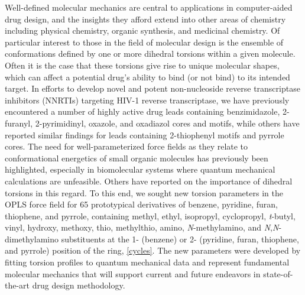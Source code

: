 \documentclass[12pt]{report}
\begin{document}
Well-defined molecular mechanics are central to applications in computer-aided drug design, and the insights they afford extend into other areas of chemistry including physical chemistry, organic synthesis, and medicinal chemistry.\cite{brameld} Of particular interest to those in the field of molecular design is the ensemble of conformations defined by one or more dihedral torsions within a given molecule. Often it is the case that these torsions give rise to unique molecular shapes, which can affect a potential drug's ability to bind (or not bind) to its intended target. In efforts to develop novel and potent non-nucleoside reverse transcriptase inhibitors (NNRTIs) targeting HIV-1 reverse transcriptase, we have previously encountered a number of highly active drug leads containing benzimidazole,\cite{kroeger} 2-furanyl,\cite{jorgbasa} 2-pyrimidinyl,\cite{thak} oxazole, and oxadiazol\cite{tipopt} cores and motifs, while others have reported similar findings for leads containing 2-thiophenyl motifs\cite{venk} and pyrrole cores.\cite{anto} The need for well-parameterized force fields as they relate to conformational energetics of small organic molecules has previously been highlighted,\cite{terhorst} especially in biomolecular systems where quantum mechanical calculations are unfeasible. Others have reported on the importance of dihedral torsions in this regard.\cite{brameld} To this end, we sought new torsion parameters in the OPLS force field\cite{jorg1996} for 65 prototypical derivatives of benzene, pyridine, furan, thiophene, and pyrrole, containing methyl, ethyl, isopropyl, cyclopropyl, \textit{t}-butyl, vinyl, hydroxy, methoxy, thio, methylthio, amino, \textit{N}-methylamino, and \textit{N},\textit{N}-dimethylamino substituents at the 1- (benzene) or 2- (pyridine, furan, thiophene, and pyrrole) position of the ring, \cref{cycles}. The new parameters were developed by fitting torsion profiles to quantum mechanical data and represent fundamental molecular mechanics that will support current and future endeavors in state-of-the-art drug design methodology.
\end{document}
